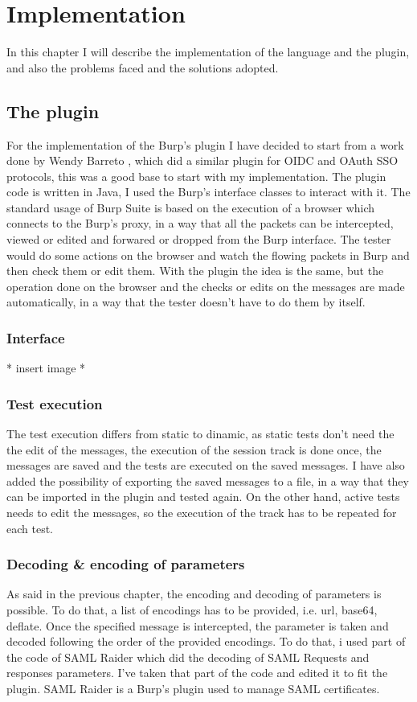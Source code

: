 \chapter{Implementation}
In this chapter I will describe the implementation of the language and the plugin, and also the problems faced and the solutions adopted.

\section{The plugin}
For the implementation of the Burp's plugin I have decided to start from a work done by Wendy Barreto \cite{wendy_barreto}, which did a similar plugin for OIDC and OAuth SSO protocols, this was a good base to start with my implementation. The plugin code is written in Java, I used the Burp's interface classes to interact with it.
The standard usage of Burp Suite is based on the execution of a browser which connects to the Burp's proxy, in a way that all the packets can be intercepted, viewed or edited and forwared or dropped from the Burp interface. The tester would do some actions on the browser and watch the flowing packets in Burp and then check them or edit them. With the plugin the idea is the same, but the operation done on the browser and the checks or edits on the messages are made automatically, in a way that the tester doesn't have to do them by itself.

\subsection{Interface}
* insert image *

\subsection{Test execution}
The test execution differs from static to dinamic, as static tests don't need the the edit of the messages, the execution of the \gls{session track} is done once, the messages are saved and the tests are executed on the saved messages. I have also added the possibility of exporting the saved messages to a file, in a way that they can be imported in the plugin and tested again.
On the other hand, active tests needs to edit the messages, so the execution of the track has to be repeated for each test.

\subsection{Decoding \& encoding of parameters}
As said in the previous chapter, the encoding and decoding of parameters is possible. To do that, a list of encodings has to be provided, i.e. url, base64, deflate. Once the specified message is intercepted, the parameter is taken and decoded following the order of the provided encodings. To do that, i used part of the code of SAML Raider \cite{saml_raider} which did the decoding of SAML Requests and responses parameters. I've taken that part of the code and edited it to fit the plugin. SAML Raider is a Burp's plugin used to manage SAML certificates.

